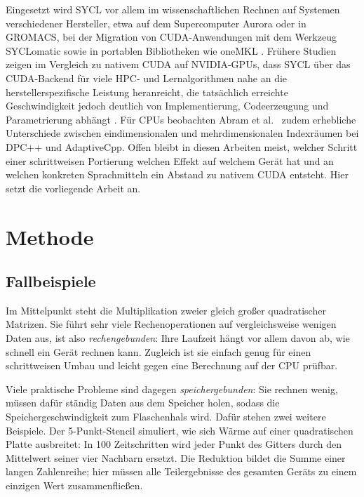 \documentclass[12pt,a4paper]{article}
\begin{document}
Eingesetzt wird SYCL vor allem im wissenschaftlichen Rechnen auf Systemen
verschiedener Hersteller, etwa auf dem Supercomputer Aurora oder in GROMACS,
bei der Migration von CUDA-Anwendungen mit dem Werkzeug SYCLomatic sowie in
portablen Bibliotheken wie oneMKL \cite{reinders2023dpcpp}. Frühere Studien
zeigen im Vergleich zu nativem CUDA auf NVIDIA-GPUs, dass SYCL über das
CUDA-Backend für viele HPC- und Lernalgorithmen nahe an die
herstellerspezifische Leistung heranreicht, die tatsächlich erreichte
Geschwindigkeit jedoch deutlich von Implementierung, Codeerzeugung und
Parametrierung abhängt \cite{deakin2020sycl, breyer2022svm}. Für CPUs
beobachten Abram et al.\ \cite{abram2025sycl} zudem erhebliche Unterschiede
zwischen eindimensionalen und mehrdimensionalen Indexräumen bei DPC++ und
AdaptiveCpp. Offen bleibt in diesen Arbeiten meist, welcher Schritt einer
schrittweisen Portierung welchen Effekt auf welchem Gerät hat und an welchen
konkreten Sprachmitteln ein Abstand zu nativem CUDA entsteht. Hier setzt die
vorliegende Arbeit an.

\section{Methode}\label{sec:methode}

\subsection{Fallbeispiele}\label{sec:m-fallbeispiele}

Im Mittelpunkt steht die Multiplikation zweier gleich großer quadratischer
Matrizen. Sie führt sehr viele Rechenoperationen auf vergleichsweise wenigen
Daten aus, ist also \emph{rechengebunden}: Ihre Laufzeit hängt vor allem davon
ab, wie schnell ein Gerät rechnen kann. Zugleich ist sie einfach genug für einen
schrittweisen Umbau und leicht gegen eine Berechnung auf der CPU prüfbar.

Viele praktische Probleme sind dagegen \emph{speichergebunden}: Sie rechnen wenig,
müssen dafür ständig Daten aus dem Speicher holen, sodass die
Speichergeschwindigkeit zum Flaschenhals wird. Dafür stehen zwei weitere
Beispiele. Der 5-Punkt-Stencil simuliert, wie sich Wärme auf einer quadratischen
Platte ausbreitet: In 100 Zeitschritten wird jeder Punkt des Gitters durch den
Mittelwert seiner vier Nachbarn ersetzt. Die Reduktion bildet die Summe einer
langen Zahlenreihe; hier müssen alle Teilergebnisse des gesamten Geräts zu einem
einzigen Wert zusammenfließen.
\end{document}
